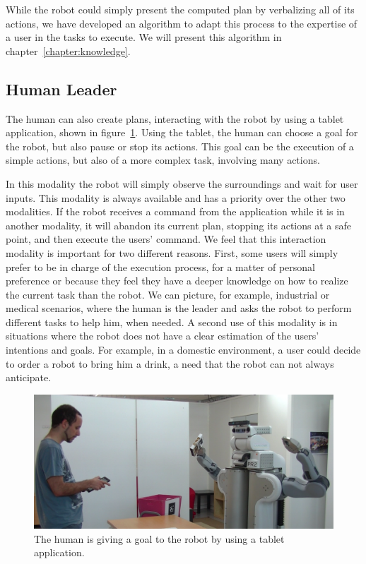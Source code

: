 While the robot could simply present the computed plan by verbalizing all of its actions, we have developed an algorithm to adapt this process to the expertise of a user in the tasks to execute. We will present this algorithm in chapter~\ref{chapter:knowledge}.

\subsection{Human Leader}
The human can also create plans, interacting with the robot by using a
tablet application, shown in figure~\ref{fig:plan_management-tablet}. Using the tablet, the human can choose a goal for the robot, but also pause or stop its actions. This goal can be the execution of a simple actions, but also of a more complex task, involving many actions.


In this modality the robot  will simply observe the surroundings and wait for user inputs. This modality is always available and has a priority over
the other two modalities. If the robot receives a command from the
application while it is in another modality, it will abandon its current
plan, stopping its actions at a safe point, and then execute the users'
command. We feel that this interaction modality is important for two
different reasons.  First, some users will simply prefer to be in
charge of the execution process, for a matter of personal preference or because they
feel they have a deeper knowledge on how to realize the current task
than the robot. We can picture, for example, industrial or medical
scenarios, where the human is the leader and asks the robot to perform
different tasks to help him, when needed. A second use of this modality is in situations where
the robot does not have  a clear estimation of the users' intentions and
goals. For example, in a domestic environment, a user could decide to
order a robot to bring him a drink, a need that the robot can not always anticipate.

\begin{figure}[ht!]
 \centering
 \includegraphics[scale=0.25]{img/coworker/plan_management/tablet.pdf}
 \caption[Giving goals to the robot]{The human is giving a goal to the robot by using a tablet application.}
 \label{fig:plan_management-tablet}
 \end{figure}

